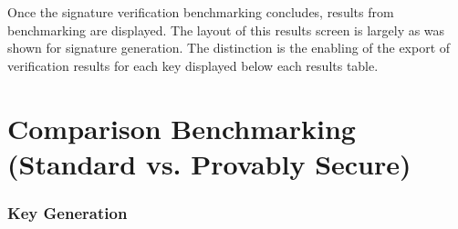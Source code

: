 \documentclass[]{final_report}
\begin{document}
Once the signature verification benchmarking concludes, results from benchmarking are displayed. The layout of this results screen is largely as was shown for signature generation. The distinction is the enabling of the export of verification results for each key displayed below each results table.



\chapter{Comparison Benchmarking (Standard vs. Provably Secure)}
\subsection{Key Generation}
\begin{figure}[H]
    \centering %
    

\end{figure}
\end{document}
